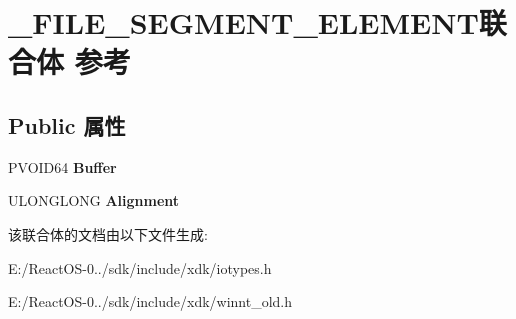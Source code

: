 \hypertarget{union___f_i_l_e___s_e_g_m_e_n_t___e_l_e_m_e_n_t}{}\section{\+\_\+\+F\+I\+L\+E\+\_\+\+S\+E\+G\+M\+E\+N\+T\+\_\+\+E\+L\+E\+M\+E\+N\+T联合体 参考}
\label{union___f_i_l_e___s_e_g_m_e_n_t___e_l_e_m_e_n_t}
\subsection*{Public 属性}
\begin{DoxyCompactItemize}
\item 
\mbox{\label{union___f_i_l_e___s_e_g_m_e_n_t___e_l_e_m_e_n_t_ac79db5774d67978e1bc26aa677c1bbf5}} 
P\+V\+O\+I\+D64 {\bfseries Buffer}
\item 
\mbox{\label{union___f_i_l_e___s_e_g_m_e_n_t___e_l_e_m_e_n_t_a4d268dbdd06c8cb7ce206d500d901eff}} 
U\+L\+O\+N\+G\+L\+O\+NG {\bfseries Alignment}
\end{DoxyCompactItemize}


该联合体的文档由以下文件生成\+:\begin{DoxyCompactItemize}
\item 
E\+:/\+React\+O\+S-\/0../sdk/include/xdk/iotypes.\+h\item 
E\+:/\+React\+O\+S-\/0../sdk/include/xdk/winnt\+\_\+old.\+h\end{DoxyCompactItemize}
